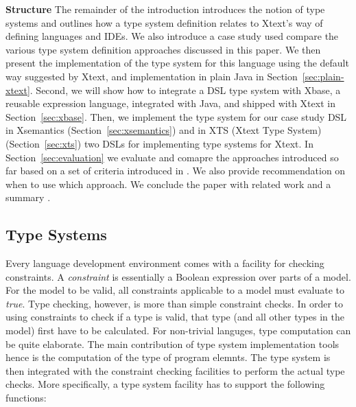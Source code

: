 \textbf{Structure} The remainder of the introduction introduces the notion of
type systems and outlines how a type system definition relates to Xtext's way of
defining languages and IDEs. We also introduce a case study used compare the
various type system definition approaches discussed in this paper. We then
present the implementation of the type system for this language using the
default way suggested by Xtext, and implementation in plain Java 
in Section~\ref{sec:plain-xtext}. Second, we will show how to integrate a DSL
type system with Xbase, a reusable expression language, integrated
with Java, and shipped with Xtext in Section~\ref{sec:xbase}. Then, we implement
the type system for our case study DSL in Xsemantics (Section~\ref{sec:xsemantics}) and 
in XTS (Xtext Type System) (Section~\ref{sec:xts}) two DSLs for implementing type
systems for Xtext. In Section~\ref{sec:evaluation} we evaluate and comapre
the approaches introduced so far based on a set of criteria introduced in
. We also provide recommendation on when to use which approach. We
conclude the paper with related work  and a summary .


\subsection{Type Systems}

Every language development environment comes with a facility for checking
constraints. A \emph{constraint} is essentially a Boolean expression over parts
of a model. For the model to be valid, all constraints applicable to a model
must evaluate to \emph{true}. Type checking, however, is more than simple
constraint checks. In order to using constraints to check if a type is valid,
that type (and all other types in the model) first have to be calculated. For
non-trivial languges, type computation can be quite elaborate. The main
contribution of type system implementation tools hence is the computation of the
type of program elemnts. The type system is then integrated with the constraint
checking facilities to perform the actual type checks. More specifically, a type
system facility has to support the following functions:

